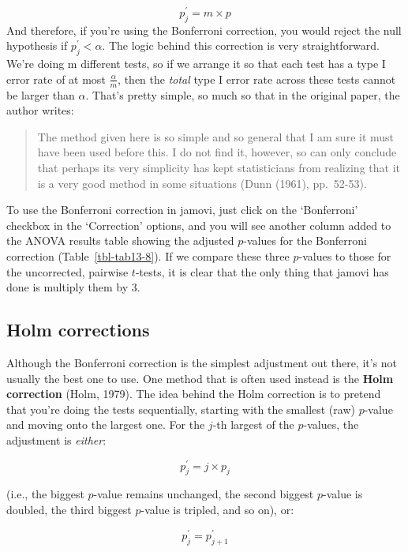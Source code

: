 \documentclass[
  a4paper,
]{book}
\begin{document}
\[p_j^{'}=m \times p\] And therefore, if you're using the Bonferroni
correction, you would reject the null hypothesis if
\(p_j^{'} < \alpha\). The logic behind this correction is very
straightforward. We're doing m different tests, so if we arrange it so
that each test has a type I error rate of at most \(\frac{\alpha}{m}\),
then the \emph{total} type I error rate across these tests cannot be
larger than \(\alpha\). That's pretty simple, so much so that in the
original paper, the author writes:

\begin{quote}
The method given here is so simple and so general that I am sure it must
have been used before this. I do not find it, however, so can only
conclude that perhaps its very simplicity has kept statisticians from
realizing that it is a very good method in some situations (Dunn (1961),
pp.~52-53).
\end{quote}

To use the Bonferroni correction in jamovi, just click on the
`Bonferroni' checkbox in the `Correction' options, and you will see
another column added to the ANOVA results table showing the adjusted
\(p\)-values for the Bonferroni correction (Table~\ref{tbl-tab13-8}). If
we compare these three \(p\)-values to those for the uncorrected,
pairwise \(t\)-tests, it is clear that the only thing that jamovi has
done is multiply them by \(3\).

\hypertarget{holm-corrections}{%
\subsection{Holm corrections}\label{holm-corrections}}

Although the Bonferroni correction is the simplest adjustment out there,
it's not usually the best one to use. One method that is often used
instead is the \textbf{Holm correction} (Holm, 1979). The idea behind
the Holm correction is to pretend that you're doing the tests
sequentially, starting with the smallest (raw) \(p\)-value and moving
onto the largest one. For the \(j\)-th largest of the \(p\)-values, the
adjustment is \emph{either}:

\[p_j^{'}=j \times p_j\]

(i.e., the biggest \(p\)-value remains unchanged, the second biggest
\(p\)-value is doubled, the third biggest \(p\)-value is tripled, and so
on), or:

\[p_j^{'}=p_{j+1}^{'}\]
\end{document}
